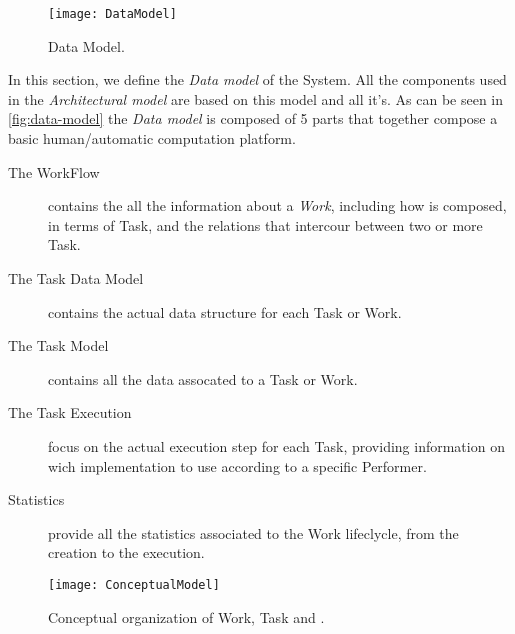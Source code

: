 \begin{figure}[htb]
    \centering
    \texttt{[image: DataModel]}
    \caption{Data Model.}
    \label{fig:data-model}
\end{figure}
In this section, we define the \emph{Data model} of the System. All the components
used in the \emph{Architectural model} are based on this model and all it's.
As can be seen in \autoref{fig:data-model} the \emph{Data model} is composed of
5 parts that together compose a basic human/automatic computation platform.

\begin{description}
	\item[The WorkFlow] contains the all the information about a \emph{Work},
    including how is composed, in terms of Task, and the relations that
    intercour between two or more Task.

    \item[The Task Data Model] contains the actual data structure for each Task
    or Work.

    \item[The Task Model] contains all the data assocated to a Task or Work.

    \item[The Task Execution] focus on the actual execution step for each Task,
    providing information on wich implementation to use according to a specific
    Performer.

    \item[Statistics] provide all the statistics associated to the Work
    lifeclycle, from the creation to the execution.
\end{description}


\begin{figure}[htb]
    \centering
    \texttt{[image: ConceptualModel]}
    \caption{Conceptual organization of Work, Task and \utask{}.}
    \label{fig:conceptual-model}
\end{figure}






